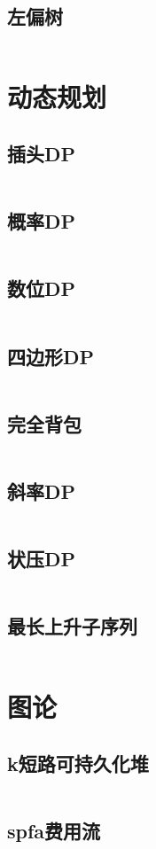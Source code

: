 \documentclass[UTF8]{ctexart}
\begin{document}
\subsection{左偏树}
\inputminted{cpp}{datastructure/左偏树.cpp}
\section{动态规划}
\subsection{插头DP}
\inputminted{cpp}{dp/插头dp.cpp}
\subsection{概率DP}
\inputminted{cpp}{dp/概率dp.cpp}
\subsection{数位DP}
\inputminted{cpp}{dp/数位dp.cpp}
\subsection{四边形DP}
\inputminted{cpp}{dp/四边形dp.cpp}
\subsection{完全背包}
\inputminted{cpp}{dp/完全背包.cpp}
\subsection{斜率DP}
\inputminted{cpp}{dp/斜率dp.cpp}
\subsection{状压DP}
\inputminted{cpp}{dp/状压dp.cpp}
\subsection{最长上升子序列}
\inputminted{cpp}{dp/最长上升子序列.cpp}
\section{图论}
\subsection{k短路可持久化堆}
\inputminted{cpp}{graphtheory/k短路可持久化堆.cpp}
\subsection{spfa费用流}
\inputminted{cpp}{graphtheory/spfa费用流.cpp}
\end{document}
